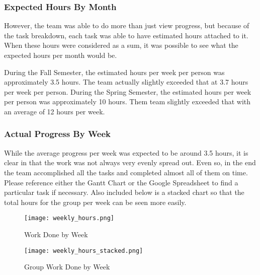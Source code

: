 \documentclass[PPFS.tex]{template/subfiles}
\begin{document}
\subsubsection{Expected Hours By Month}
However, the team was able to do more than just view progress, but because of the task breakdown, each task was able to have estimated hours attached to it. When these hours were considered as a sum, it was possible to see what the expected hours per month would be.

During the Fall Semester, the estimated hours per week per person was approximately 3.5 hours. The team actually slightly exceeded that at 3.7 hours per week per person. During the Spring Semester, the estimated hours per week per person was approximately 10 hours. Them team slightly exceeded that with an average of 12 hours per week.

\subsubsection{Actual Progress By Week}

While the average progress per week was expected to be around 3.5 hours, it is clear in  that the work was not always very evenly spread out. Even so, in the end the team accomplished all the tasks and completed almost all of them on time. Please reference either the Gantt Chart or the Google Spreadsheet to find a particular task if necessary. Also included below is a stacked chart so that the total hours for the group per week can be seen more easily.

\begin{figure}[H]
    \centering
    \texttt{[image: weekly\_hours.png]}
    \caption{Work Done by Week}
    \label{fig:groupHours}
\end{figure}

\begin{figure}[H]
    \centering
    \texttt{[image: weekly\_hours\_stacked.png]}
    \caption{Group Work Done by Week}
    \label{fig:groupHoursStacked}
\end{figure}
\end{document}
